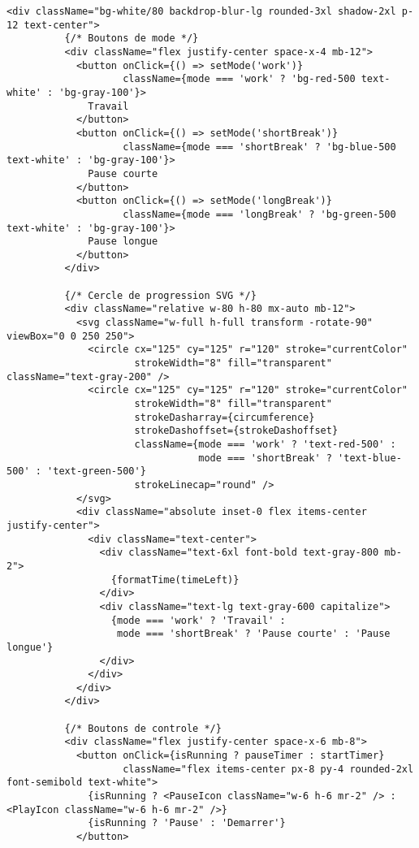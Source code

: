 \documentclass[12pt,a4paper]{article}
\begin{document}
\begin{lstlisting}[caption=Pomodoro.tsx - Timer Pomodoro complet (Robin)]
        <div className="bg-white/80 backdrop-blur-lg rounded-3xl shadow-2xl p-12 text-center">
          {/* Boutons de mode */}
          <div className="flex justify-center space-x-4 mb-12">
            <button onClick={() => setMode('work')} 
                    className={mode === 'work' ? 'bg-red-500 text-white' : 'bg-gray-100'}>
              Travail
            </button>
            <button onClick={() => setMode('shortBreak')}
                    className={mode === 'shortBreak' ? 'bg-blue-500 text-white' : 'bg-gray-100'}>
              Pause courte
            </button>
            <button onClick={() => setMode('longBreak')}
                    className={mode === 'longBreak' ? 'bg-green-500 text-white' : 'bg-gray-100'}>
              Pause longue
            </button>
          </div>

          {/* Cercle de progression SVG */}
          <div className="relative w-80 h-80 mx-auto mb-12">
            <svg className="w-full h-full transform -rotate-90" viewBox="0 0 250 250">
              <circle cx="125" cy="125" r="120" stroke="currentColor"
                      strokeWidth="8" fill="transparent" className="text-gray-200" />
              <circle cx="125" cy="125" r="120" stroke="currentColor"
                      strokeWidth="8" fill="transparent"
                      strokeDasharray={circumference}
                      strokeDashoffset={strokeDashoffset}
                      className={mode === 'work' ? 'text-red-500' :
                                 mode === 'shortBreak' ? 'text-blue-500' : 'text-green-500'}
                      strokeLinecap="round" />
            </svg>
            <div className="absolute inset-0 flex items-center justify-center">
              <div className="text-center">
                <div className="text-6xl font-bold text-gray-800 mb-2">
                  {formatTime(timeLeft)}
                </div>
                <div className="text-lg text-gray-600 capitalize">
                  {mode === 'work' ? 'Travail' :
                   mode === 'shortBreak' ? 'Pause courte' : 'Pause longue'}
                </div>
              </div>
            </div>
          </div>

          {/* Boutons de controle */}
          <div className="flex justify-center space-x-6 mb-8">
            <button onClick={isRunning ? pauseTimer : startTimer}
                    className="flex items-center px-8 py-4 rounded-2xl font-semibold text-white">
              {isRunning ? <PauseIcon className="w-6 h-6 mr-2" /> : <PlayIcon className="w-6 h-6 mr-2" />}
              {isRunning ? 'Pause' : 'Demarrer'}
            </button>
            

\end{lstlisting}
\end{document}
